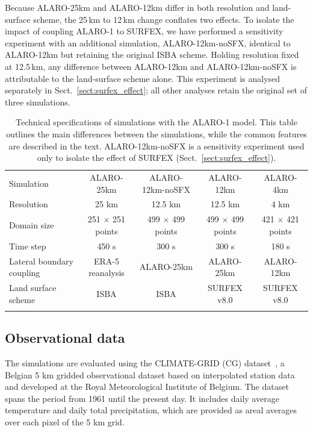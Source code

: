 \documentclass[journal abbreviation, manuscript]{copernicus}
\begin{document}
Because ALARO-25km and ALARO-12km differ in both resolution and land-surface scheme, the 25\,km to 12\,km change conflates two effects. 
To isolate the impact of coupling ALARO-1 to SURFEX, we have performed a sensitivity experiment with an additional simulation, ALARO-12km-noSFX, identical to ALARO-12km but retaining the original ISBA scheme. 
Holding resolution fixed at 12.5\,km, any difference between ALARO-12km and ALARO-12km-noSFX is attributable to the land-surface scheme alone. 
This experiment is analysed separately in Sect.~\ref{sect:surfex_effect}; all other analyses retain the original set of three simulations.

\begin{table}[t]
\caption{Technical specifications of simulations with the ALARO-1 model. This table outlines the main differences between the simulations, while the common features are described in the text. ALARO-12km-noSFX is a sensitivity experiment used only to isolate the effect of SURFEX (Sect.~\ref{sect:surfex_effect}).}
\begin{tabular}{lcccc}
\tophline
Simulation & ALARO-25km & ALARO-12km-noSFX & ALARO-12km & ALARO-4km \\
\middlehline
Resolution & 25 km & 12.5 km & 12.5 km & 4 km \\
Domain size & 251 $\times$ 251 points & 499 $\times$ 499 points & 499 $\times$ 499 points & 421 $\times$ 421 points \\
Time step & 450 s & 300 s & 300 s & 180 s \\
Lateral boundary coupling & ERA-5 reanalysis & ALARO-25km & ALARO-25km & ALARO-12km \\
Land surface scheme & ISBA & ISBA & SURFEX v8.0 & SURFEX v8.0 \\
\bottomhline
\end{tabular}
\belowtable{} \label{tab:technical}
\end{table}

\subsection{Observational data}
\label{sect:obs}

The simulations are evaluated using the CLIMATE-GRID (CG) dataset~\citep{journee_overview_2019}, a Belgian 5 km gridded observational dataset based on interpolated station data and developed at the Royal Meteorological Institute of Belgium. 
The dataset spans the period from 1961 until the present day.
It includes daily average temperature and daily total precipitation, which are provided as areal averages over each pixel of the 5 km grid. 
\end{document}
